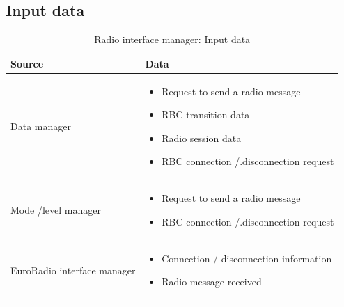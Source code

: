 \documentclass[nocc]{template/openetcs_report}
\begin{document}
\subsection{Input data}
			\begin{longtable}{|l|l|}
				\caption{Radio interface manager: Input data}\\ 
				\hline
				
					\begin{minipage}[t]{0.35\linewidth} \textbf{Source}	\end{minipage} 
				&	\begin{minipage}[t]{0.65\linewidth} \textbf{Data} \end{minipage} \\
				
				\hline
																																									
					\begin{minipage}[t]{0.35\linewidth} Data manager	\end{minipage} 
				&	\begin{minipage}[t]{0.65\linewidth}
						\begin{itemize}
							\item Request to send a radio message
							\item RBC transition data
							\item Radio session data
							\item RBC connection /.disconnection request
						\end{itemize}
					\end{minipage} \\
				
				\hline
				
					\begin{minipage}[t]{0.35\linewidth} Mode /level manager	\end{minipage} 
				&	\begin{minipage}[t]{0.65\linewidth}
						\begin{itemize}
							\item Request to send a radio message
							\item RBC connection /.disconnection request
						\end{itemize}			
					\end{minipage} \\
				
				\hline
					
					\begin{minipage}[t]{0.35\linewidth} EuroRadio interface manager	\end{minipage} 
				&	\begin{minipage}[t]{0.65\linewidth}
						\begin{itemize}
							\item Connection / disconnection information
							\item Radio message received
						\end{itemize}			
					\end{minipage} \\
				

\end{longtable}
\end{document}
